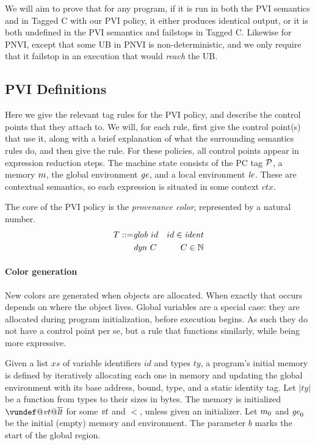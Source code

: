 \documentclass[acmsmall,review,anonymous]{acmart}\settopmatter{printfolios=true,printccs=false,printacmref=false}
\begin{document}
We will aim to prove that for any program, if it is run in both the PVI semantics
and in Tagged C with our PVI policy, it either produces identical output, or it is both
undefined in the PVI semantics and failstops in Tagged C. Likewise for PNVI, except that
some UB in PNVI is non-deterministic, and we only require that it failstop in an execution
that would {\it reach} the UB.

\subsection{PVI Definitions}

Here we give the relevant tag rules for the PVI policy, and describe the control points that
they attach to. We will, for each rule, first give the control point(s) that use it, along
with a brief explanation of what the surrounding semantics rules do, and then give the rule.
For these policies, all control points appear in expression reduction steps.
The machine state consists of the PC tag \(\mathcal{P}\), a memory \(m\),
the global environment \(\mathit{ge}\), and a local environment \(\mathit{le}\). These are contextual semantics,
so each expression is situated in some context \(\mathit{ctx}\).

The core of the PVI policy is the {\it provenance color}, represented
by a natural number.
%
\begin{align*}
  T ::= & \mathit{glob} ~ id & id \in \mathit{ident} \\
  & \mathit{dyn} ~ C & C \in \mathbb{N} \\
\end{align*}

\paragraph*{Color generation}

New colors are generated when objects are allocated. When exactly that occurs
depends on where the object lives. Global variables are a special case: they are
allocated during program initialization, before execution begins. As such they
do not have a control point per se, but a rule that functions similarly, while
being more expressive.


Given a list \(xs\) of variable identifiers \(id\) and types
\(ty\), a program's initial memory is defined by iteratively allocating each one
in memory and updating the global environment with its base address, bound, type,
and a static identity tag. Let \(|ty|\) be a function from types to their sizes
in bytes. The memory is initialized \(\vundef@\vt@\overline{\lt}\)
for some \(\mathit{vt}\) and \(\overline{\lt}\), unless given an initializer.
Let \(m_0\) and \(\mathit{ge}_0\) be the initial (empty) memory and environment.
The parameter \(b\) marks the start of the global region.
\end{document}
